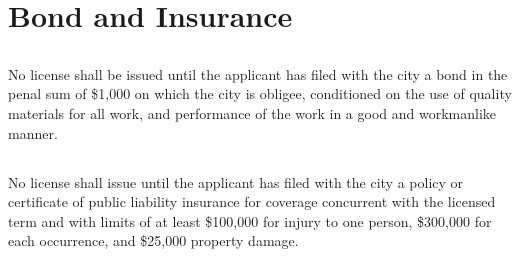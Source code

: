 \section{Bond and Insurance}
\subsection{}
No license shall be issued until the applicant has filed with the city a bond in the penal sum of \$1,000 on which the city is obligee, conditioned on the use of quality materials for all work, and performance of the work in a good and workmanlike manner.
\subsection{}
No license shall issue until the applicant has filed with the city a policy or certificate of public liability insurance for coverage concurrent with the licensed term and with limits of at least \$100,000 for injury to one person, \$300,000 for each occurrence, and \$25,000 property damage.
